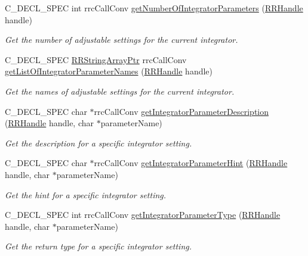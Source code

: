\begin{DoxyCompactItemize}
C\+\_\+\+D\+E\+C\+L\+\_\+\+S\+P\+E\+C int rrc\+Call\+Conv \hyperlink{group__simopts_ga551b3fc29362907cd6f69f23ac7bf7cc}{get\+Number\+Of\+Integrator\+Parameters} (\hyperlink{rrc__types_8h_a1d68f0592372208fa5a5f2799ea4b3ae}{R\+R\+Handle} handle)
\begin{DoxyCompactList}\small\item\em Get the number of adjustable settings for the current integrator. \end{DoxyCompactList}\item 
C\+\_\+\+D\+E\+C\+L\+\_\+\+S\+P\+E\+C \hyperlink{rrc__types_8h_a7c9475df6c7337d99482b13a365e7596}{R\+R\+String\+Array\+Ptr} rrc\+Call\+Conv \hyperlink{group__simopts_gaabaab4b46d128a4686f7b710368a5f97}{get\+List\+Of\+Integrator\+Parameter\+Names} (\hyperlink{rrc__types_8h_a1d68f0592372208fa5a5f2799ea4b3ae}{R\+R\+Handle} handle)
\begin{DoxyCompactList}\small\item\em Get the names of adjustable settings for the current integrator. \end{DoxyCompactList}\item 
C\+\_\+\+D\+E\+C\+L\+\_\+\+S\+P\+E\+C char $\ast$rrc\+Call\+Conv \hyperlink{group__simopts_ga4e1bff8961e09923c786dbaaf108e903}{get\+Integrator\+Parameter\+Description} (\hyperlink{rrc__types_8h_a1d68f0592372208fa5a5f2799ea4b3ae}{R\+R\+Handle} handle, char $\ast$parameter\+Name)
\begin{DoxyCompactList}\small\item\em Get the description for a specific integrator setting. \end{DoxyCompactList}\item 
C\+\_\+\+D\+E\+C\+L\+\_\+\+S\+P\+E\+C char $\ast$rrc\+Call\+Conv \hyperlink{group__simopts_gad4109215ad180a0fd8da0b6aa4f7e6c4}{get\+Integrator\+Parameter\+Hint} (\hyperlink{rrc__types_8h_a1d68f0592372208fa5a5f2799ea4b3ae}{R\+R\+Handle} handle, char $\ast$parameter\+Name)
\begin{DoxyCompactList}\small\item\em Get the hint for a specific integrator setting. \end{DoxyCompactList}\item 
C\+\_\+\+D\+E\+C\+L\+\_\+\+S\+P\+E\+C int rrc\+Call\+Conv \hyperlink{group__simopts_gafb51cd6e56a7b09b3958b00a42f5035f}{get\+Integrator\+Parameter\+Type} (\hyperlink{rrc__types_8h_a1d68f0592372208fa5a5f2799ea4b3ae}{R\+R\+Handle} handle, char $\ast$parameter\+Name)
\begin{DoxyCompactList}\small\item\em Get the return type for a specific integrator setting. \end{DoxyCompactList}\item 

\end{DoxyCompactItemize}
